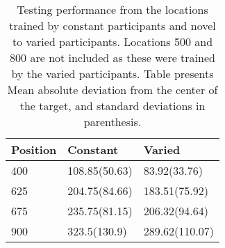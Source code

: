 \documentclass[
  jou, donotrepeattitle,floatsintext]{article}
\begin{document}
\begin{table}

\caption{\label{tab:e2tab3}Testing performance from the locations trained by constant participants and novel to varied participants. Locations 500 and 800 are not included as these were trained by the varied participants. Table presents Mean absolute deviation from the center of the target, and standard deviations in parenthesis.}
\begin{tabular}[t]{lll}
\toprule
Position & Constant & Varied\\
\midrule
400 & 108.85(50.63) & 83.92(33.76)\\
625 & 204.75(84.66) & 183.51(75.92)\\
675 & 235.75(81.15) & 206.32(94.64)\\
900 & 323.5(130.9) & 289.62(110.07)\\
\bottomrule
\end{tabular}
\end{table}
\end{document}
